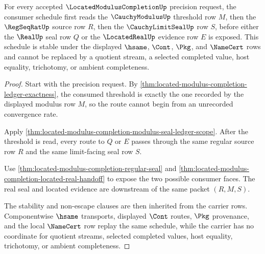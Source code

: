 \begin{theorem}
\label{thm:located-modulus-completion-schedule-seal}
For every accepted $\LocatedModulusCompletionUp$ precision request, the consumer schedule first reads the $\CauchyModulusUp$ threshold row $M$, then the $\RegSeqRatUp$ source row $R$, then the $\CauchyLimitSealUp$ row $S$, before either the $\RealUp$ seal row $Q$ or the $\LocatedRealUp$ evidence row $E$ is exposed. This schedule is stable under the displayed $\hsame$, $\Cont$, $\Pkg$, and $\NameCert$ rows and cannot be replaced by a quotient stream, a selected completed value, host equality, trichotomy, or ambient completeness.
\end{theorem}
\begin{proof}
Start with the precision request. By \autoref{thm:located-modulus-completion-ledger-exactness}, the consumed threshold is exactly the one recorded by the displayed modulus row $M$, so the route cannot begin from an unrecorded convergence rate.

Apply \autoref{thm:located-modulus-completion-modulus-seal-ledger-scope}. After the threshold is read, every route to $Q$ or $E$ passes through the same regular source row $R$ and the same limit-facing seal row $S$.

Use \autoref{thm:located-modulus-completion-regular-seal} and \autoref{thm:located-modulus-completion-located-real-handoff} to expose the two possible consumer faces. The real seal and located evidence are downstream of the same packet $(R,M,S)$.

The stability and non-escape clauses are then inherited from the carrier rows. Componentwise $\hsame$ transports, displayed $\Cont$ routes, $\Pkg$ provenance, and the local $\NameCert$ row replay the same schedule, while the carrier has no coordinate for quotient streams, selected completed values, host equality, trichotomy, or ambient completeness.
\end{proof}

